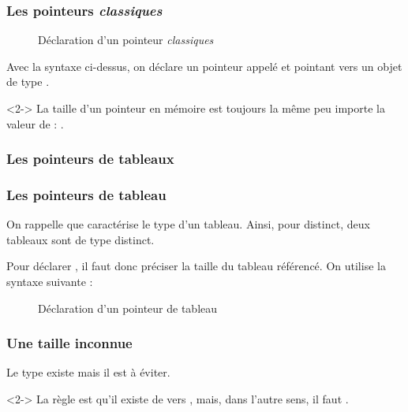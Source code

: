 \documentclass{cppcourses}
\begin{document}
\begin{frame}

\frametitle{Les pointeurs \emph{classiques}}

\begin{figure}
\mykeyword{\textcolor{orange}{<type>}* \textcolor{red}{<identifiant>};}
\caption{Déclaration d'un pointeur \emph{classiques}}
\end{figure}

Avec la syntaxe ci-dessus, on déclare un pointeur appelé \mykeyword{\textcolor{red}{identifiant}} et pointant vers un objet de type \mykeyword{\textcolor{orange}{type}}.

\begin{remark}<2->
La taille d'un pointeur en mémoire est toujours la même peu importe la valeur de \mykeyword{\textcolor{orange}{type}} : .
\end{remark}

\end{frame}

\subsubsection{Les pointeurs de tableaux}

\begin{frame}

\frametitle{Les pointeurs de tableau}

\begin{remark}
On rappelle que \mykeyword{\textcolor{orange}{<type>}[\textcolor{blue}{<N>}]} caractérise le type d'un tableau. Ainsi, pour \mykeyword{\textcolor{blue}{N}} distinct, deux tableaux sont de type distinct.
\end{remark}

Pour déclarer , il faut donc préciser la taille du tableau référencé. On utilise la syntaxe suivante :

\begin{figure}
\mykeyword{\textcolor{orange}{<type>} (*\textcolor{red}{<identifiant>})[\textcolor{blue}{<N>}];}
\caption{Déclaration d'un pointeur de tableau}
\end{figure}

\end{frame}

\begin{frame}

\frametitle{Une taille inconnue}

\begin{remark}
Le type \mykeyword{\textcolor{orange}{<type>} (*\textcolor{red}{<identifiant>})[]} existe mais il est à éviter.
\end{remark}

\begin{remark}<2->
La règle est qu'il existe  de \mykeyword{\textcolor{orange}{<type>} (*\textcolor{red}{<identifiant>})[\textcolor{blue}{<N>}]} vers \mykeyword{\textcolor{orange}{<type>} (*\textcolor{red}{<identifiant>})[]}, mais, dans l'autre sens, il faut .
\end{remark}

\end{frame}
\end{document}
